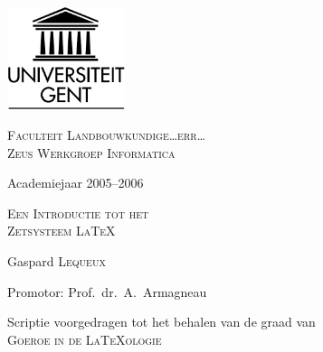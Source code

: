 
\begin{titlepage}

\fontsize{12pt}{14pt}\selectfont

\begin{center}

\includegraphics[height=3cm]{figuren/ruglogo}

\vspace{1cm}

\fontsize{14pt}{17pt}\selectfont
\textsc{Faculteit Landbouwkundige\ldots err\ldots\\\textsc{Zeus} Werkgroep Informatica}
\fontsize{12pt}{14pt}\selectfont
\vspace{0.3cm}

\vspace{1.2cm}

Academiejaar 2005--2006

\vspace{2.8cm}

\fontsize{17.28pt}{21pt}\selectfont

{\textsc{Een Introductie tot het\\ Zetsysteem \LaTeX}}

\fontsize{12pt}{14pt}\selectfont

\vspace{3cm}

Gaspard \textsc{Lequeux}	

\vspace{1.6cm}

Promotor: Prof.~dr.~A.~Armagneau\\

\vspace{2cm}

Scriptie voorgedragen tot het behalen van de graad van\\
\textsc{Goeroe in de \LaTeX ologie}

\end{center}
\end{titlepage}

\thispagestyle{empty}

